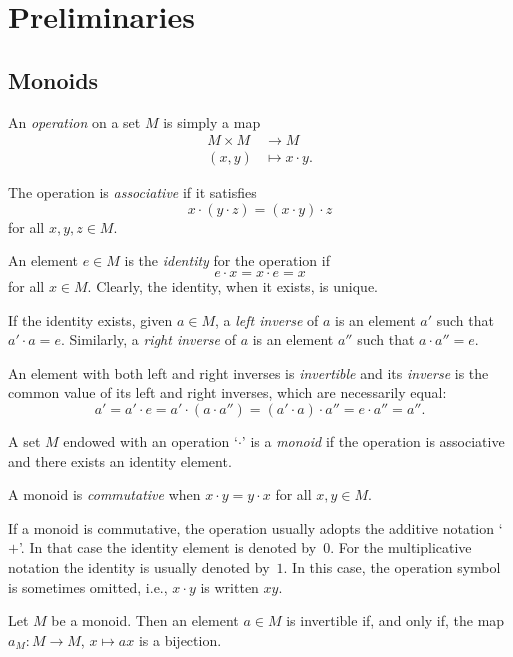 \chapter{Preliminaries}

\section{Monoids}

An \textsl{operation} on a set $M$ is simply a map
\begin{align*}
    M\times M&\to M\\
    (x,y)&\mapsto x\cdot y.
\end{align*}

The operation is \textsl{associative} if it satisfies
$$
    x\cdot(y\cdot z) = (x\cdot y)\cdot z
$$
for all $x,y,z\in M$.

An element $e\in M$ is the \textsl{identity} for the operation if
$$
    e\cdot x = x\cdot e = x
$$
for all $x\in M$. Clearly, the identity, when it exists, is unique.

If the identity exists, given $a\in M$, a \textsl{left inverse} of $a$ is an element $a'$ such that $a'\cdot a= e$. Similarly, a \textsl{right inverse} of $a$ is an element $a''$ such that $a\cdot a''=e$.

An element with both left and right inverses is \textsl{invertible} and its \textsl{inverse} is the common value of its left and right inverses, which are necessarily equal:
$$
    a' = a'\cdot e = a'\cdot (a\cdot a'') = (a'\cdot a)\cdot a''
        = e\cdot a'' = a''.
$$

A set $M$ endowed with an operation `$\cdot$' is a \textsl{monoid} if the operation is associative and there exists an identity element.

A monoid is \textsl{commutative} when $x\cdot y=y\cdot x$ for all $x,y\in M$.

If a monoid is commutative, the operation usually adopts the additive notation `$+$'. In that case the identity element is denoted by~$0$. For the multiplicative notation the identity is usually denoted by~$1$. In this case, the operation symbol is sometimes omitted, i.e., $x\cdot y$ is written $xy$.

\begin{prop}\label{prop:monoid-left-inverse}
    Let\/ $M$ be a monoid. Then an element\/ $a\in M$ is invertible if, and only if, the map\/ $a_M\colon M\to M$, $x\mapsto ax$ is a bijection.
\end{prop}


